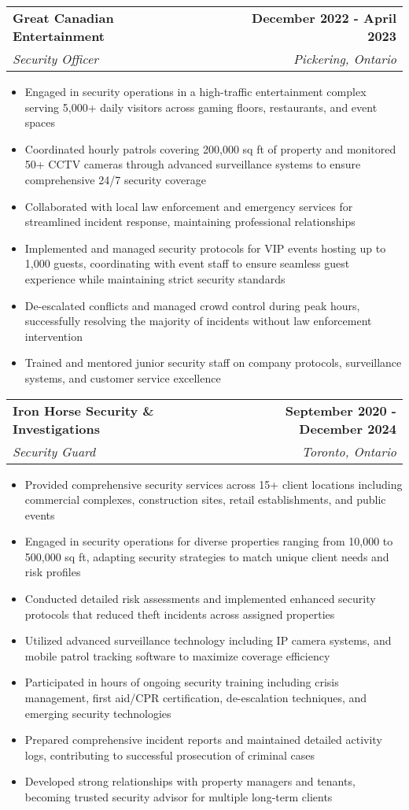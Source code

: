 \documentclass[letterpaper,11pt]{article}
\makeatletter
\newcommand{\resumeItem}[1]{
  \item\small{
    {#1 \vspace{-2pt}}
  }
}
\newcommand{\resumeSubheading}[4]{
  \vspace{-2pt}\item
    \begin{tabular*}{1.0\textwidth}[t]{l@{\extracolsep{\fill}}r}
      \textbf{#1} & \textbf{\small #2} \\
      \textit{\small#3} & \textit{\small #4} \\
    \end{tabular*}\vspace{-7pt}
}
\newcommand{\resumeItemListStart}{\begin{itemize}}
\newcommand{\resumeItemListEnd}{\end{itemize}\vspace{-5pt}}
\makeatother
\begin{document}
    \resumeSubheading
      {Great Canadian Entertainment}{December 2022 - April 2023}
      {Security Officer}{Pickering, Ontario}
      \resumeItemListStart
        \resumeItem{Engaged in security operations in a high-traffic entertainment complex serving 5,000+ daily visitors across gaming floors, restaurants, and event spaces}
        \resumeItem{Coordinated hourly patrols covering 200,000 sq ft of property and monitored 50+ CCTV cameras through advanced surveillance systems to ensure comprehensive 24/7 security coverage}
        \resumeItem{Collaborated with local law enforcement and emergency services for streamlined incident response, maintaining professional relationships}
        \resumeItem{Implemented and managed security protocols for VIP events hosting up to 1,000 guests, coordinating with event staff to ensure seamless guest experience while maintaining strict security standards}
        \resumeItem{De-escalated conflicts and managed crowd control during peak hours, successfully resolving the majority of incidents without law enforcement intervention}
        \resumeItem{Trained and mentored junior security staff on company protocols, surveillance systems, and customer service excellence}
      \resumeItemListEnd

    \resumeSubheading
      {Iron Horse Security \& Investigations}{September 2020 - December 2024}
      {Security Guard}{Toronto, Ontario}
      \resumeItemListStart
        \resumeItem{Provided comprehensive security services across 15+ client locations including commercial complexes, construction sites, retail establishments, and public events}
        \resumeItem{Engaged in security operations for diverse properties ranging from 10,000 to 500,000 sq ft, adapting security strategies to match unique client needs and risk profiles}
        \resumeItem{Conducted detailed risk assessments and implemented enhanced security protocols that reduced theft incidents across assigned properties}
        \resumeItem{Utilized advanced surveillance technology including IP camera systems, and mobile patrol tracking software to maximize coverage efficiency}
        \resumeItem{Participated in hours of ongoing security training including crisis management, first aid/CPR certification, de-escalation techniques, and emerging security technologies}
        \resumeItem{Prepared comprehensive incident reports and maintained detailed activity logs, contributing to successful prosecution of criminal cases}
        \resumeItem{Developed strong relationships with property managers and tenants, becoming trusted security advisor for multiple long-term clients}
    \resumeItemListEnd
    
\end{document}
